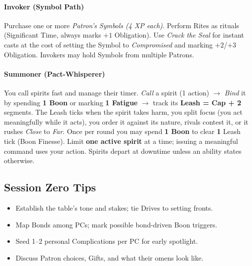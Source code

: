 \paragraph{Invoker (Symbol Path)}
Purchase one or more \emph{Patron’s Symbols (4 XP each)}. Perform Rites as rituals (Significant Time, always marks $+1$ Obligation). Use \emph{Crack the Seal} for instant casts at the cost of setting the Symbol to \emph{Compromised} and marking $+2$/$+3$ Obligation. Invokers may hold Symbols from multiple Patrons.

\paragraph{Summoner (Pact-Whisperer)}
You call spirits fast and manage their timer. \emph{Call} a spirit (1 action) $\rightarrow$ \emph{Bind} it by spending \textbf{1 Boon} or marking \textbf{1 Fatigue} $\rightarrow$ track its \textbf{Leash = Cap + 2} segments. The Leash ticks when the spirit takes harm, you split focus (you act meaningfully while it acts), you order it against its nature, rivals contest it, or it rushes \emph{Close} to \emph{Far}. Once per round you may spend \textbf{1 Boon} to clear \textbf{1} Leash tick (Boon Finesse). Limit \textbf{one active spirit} at a time; issuing a meaningful command uses your action. Spirits depart at downtime unless an ability states otherwise.

\subsection{Session Zero Tips}
\begin{itemize}
  \item Establish the table’s tone and stakes; tie Drives to setting fronts.
  \item Map Bonds among PCs; mark possible bond-driven Boon triggers.
  \item Seed 1--2 personal Complications per PC for early spotlight.
  \item Discuss Patron choices, Gifts, and what their omens look like.
\end{itemize}